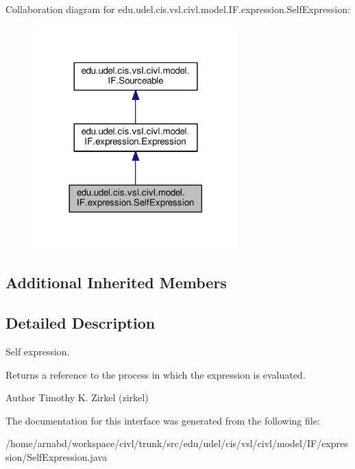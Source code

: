 Collaboration diagram for edu.\+udel.\+cis.\+vsl.\+civl.\+model.\+I\+F.\+expression.\+Self\+Expression\+:
\nopagebreak
\begin{figure}[H]
\begin{center}
\leavevmode
\includegraphics[width=225pt]{interfaceedu_1_1udel_1_1cis_1_1vsl_1_1civl_1_1model_1_1IF_1_1expression_1_1SelfExpression__coll__graph}
\end{center}
\end{figure}
\subsection*{Additional Inherited Members}


\subsection{Detailed Description}
Self expression. 

Returns a reference to the process in which the expression is evaluated.

\begin{DoxyAuthor}{Author}
Timothy K. Zirkel (zirkel) 
\end{DoxyAuthor}


The documentation for this interface was generated from the following file\+:\begin{DoxyCompactItemize}
\item 
/home/arnabd/workspace/civl/trunk/src/edu/udel/cis/vsl/civl/model/\+I\+F/expression/Self\+Expression.\+java\end{DoxyCompactItemize}
